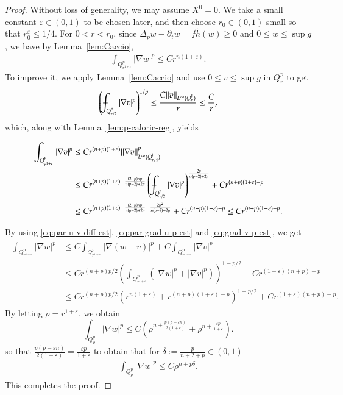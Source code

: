 \documentclass[11pt,oneside,english]{amsart}
\newcommand{\e}{\varepsilon}
\newcommand{\de}{\delta}
\newcommand{\D}{\nabla}
\numberwithin{equation}{section}
\def\Xint#1{\mathchoice
  {\XXint\displaystyle\textstyle{#1}}%
  {\XXint\textstyle\scriptstyle{#1}}%
  {\XXint\scriptstyle\scriptscriptstyle{#1}}%
  {\XXint\scriptscriptstyle\scriptscriptstyle{#1}}%
  \!\int}
\def\XXint#1#2#3{{\setbox0=\hbox{$#1{#2#3}{\int}$}
    \vcenter{\hbox{$#2#3$}}\kern-.5\wd0}}
\def\dashint{\Xint-}
\theoremstyle{plain}
\numberwithin{equation}{section}
\begin{document}
\begin{proof}Without loss of generality, we may assume $X^0=0$. We take a small constant $\e\in(0,1)$ to be chosen later, and then choose $r_0\in(0,1)$ small so that $r_0^\e\le 1/4$. For $0<r<r_0$, since $\Delta_pw-\partial_tw=f\tilde h(w)\ge 0$ and $0\le w\le \sup g$, we have by Lemma~\ref{lem:Caccio},
\begin{align}
    \label{eq:par-grad-u-p-est}
    \int_{Q^p_{r^{1+\e}}}|\D w|^p\le Cr^{n(1+\e)}.
\end{align}
To improve it, we apply Lemma~\ref{lem:Caccio} and use $0\le v\le \sup g$ in $Q_r^p$ to get
\begin{align}
    \label{eq:par-grad-v-sup-est}
    \left(\dashint_{Q_{r/2}^p}|\D v|^p\right)^{1/p}\le \frac{C\|v\|_{L^\infty(Q_{r}^p)}}{r}\le  \frac Cr,
\end{align}
which, along with Lemma~\ref{lem:p-caloric-reg}, yields

\begin{align}\label{eq:grad-v-p-est}
        \int_{Q^p_{r^{1+\e}}}|\D v|^p &\le Cr^{(n+p)(1+\e)}\|\D v\|_{L^\infty(Q^p_{r/4})}^p\\&\le Cr^{(n+p)(1+\e)+\frac{(2-p)np}{n(p-2)+2p}}\left(\dashint_{Q^p_{r/2}}|\D v|^p\right)^{\frac{2p}{n(p-2)+2p}}+Cr^{(n+p)(1+\e)-p}\\
        &\le Cr^{(n+p)(1+\e)+\frac{(2-p)np}{n(p-2)+2p}-\frac{2p^2}{n(p-2)+2p}}+Cr^{(n+p)(1+\e)-p}\le Cr^{(n+p)(1+\e)-p}.
\end{align}

By using \eqref{eq:par-u-v-diff-est}, \eqref{eq:par-grad-u-p-est} and \eqref{eq:grad-v-p-est}, we get
\begin{align}
    \label{eq:par-grad-u-ep-est}\begin{split}
    \int_{Q^p_{r^{1+\e}}}|\D w|^p&\le C\int_{Q^p_{r^{1+\e}}}|\D(w-v)|^p+C\int_{Q^p_{r^{1+\e}}}|\D v|^p\\
    &\le Cr^{(n+p)p/2}\left(\int_{Q^p_{r^{1+\e}}}(|\D w|^p+|\D v|^p)\right)^{1-p/2}+Cr^{(1+\e)(n+p)-p }\\
    &\le Cr^{(n+p)p/2}\left(r^{n(1+\e)}+r^{(n+p)(1+\e)-p}\right)^{1-p/2}+Cr^{(1+\e)(n+p)-p}.
    \end{split}
\end{align}
By letting $\rho=r^{1+\e}$, we obtain
$$
\int_{Q^p_\rho}|\D w|^p\le C\left(\rho^{n+\frac{p(p-\e n)}{2(1+\e)}}+\rho^{n+\frac{\e p}{1+\e}}\right).
$$
so that $\frac{p(p-\e n)}{2(1+\e)}=\frac{\e p}{1+\e}$ to obtain that for $\de:=\frac{p}{n+2+p}\in(0,1)$
\begin{align}
    \label{eq:par-grad-u-est-1}
    \int_{Q^p_\rho}|\D w|^p\le C\rho^{n+p\de}.
\end{align}
This completes the proof.
\end{proof}
\end{document}
